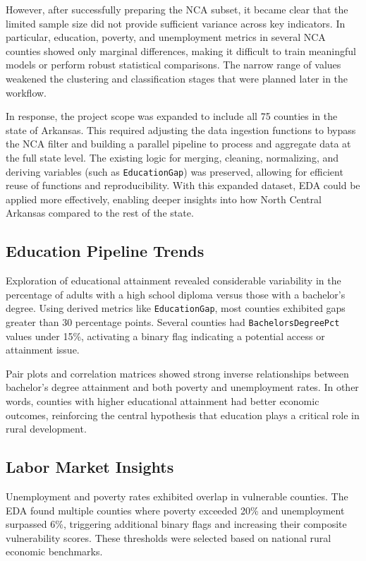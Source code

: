 \documentclass[12pt]{llncs}
\begin{document}
However, after successfully preparing the NCA subset, it became clear that the limited sample size did not provide sufficient variance across key indicators. In particular, education, poverty, and unemployment metrics in several NCA counties showed only marginal differences, making it difficult to train meaningful models or perform robust statistical comparisons. The narrow range of values weakened the clustering and classification stages that were planned later in the workflow.

In response, the project scope was expanded to include all 75 counties in the state of Arkansas. This required adjusting the data ingestion functions to bypass the NCA filter and building a parallel pipeline to process and aggregate data at the full state level. The existing logic for merging, cleaning, normalizing, and deriving variables (such as \texttt{EducationGap}) was preserved, allowing for efficient reuse of functions and reproducibility. With this expanded dataset, EDA could be applied more effectively, enabling deeper insights into how North Central Arkansas compared to the rest of the state.

\subsection{Education Pipeline Trends}

Exploration of educational attainment revealed considerable variability in the percentage of adults with a high school diploma versus those with a bachelor’s degree. Using derived metrics like \texttt{EducationGap}, most counties exhibited gaps greater than 30 percentage points. Several counties had \texttt{BachelorsDegreePct} values under 15\%, activating a binary flag indicating a potential access or attainment issue.

Pair plots and correlation matrices showed strong inverse relationships between bachelor’s degree attainment and both poverty and unemployment rates. In other words, counties with higher educational attainment had better economic outcomes, reinforcing the central hypothesis that education plays a critical role in rural development.

\subsection{Labor Market Insights}

Unemployment and poverty rates exhibited overlap in vulnerable counties. The EDA found multiple counties where poverty exceeded 20\% and unemployment surpassed 6\%, triggering additional binary flags and increasing their composite vulnerability scores. These thresholds were selected based on national rural economic benchmarks.
\end{document}
